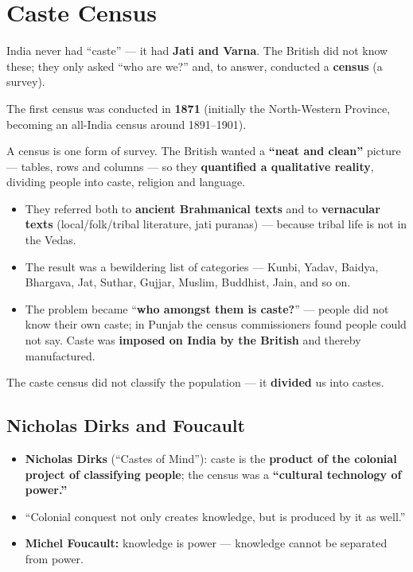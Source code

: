 \section{Caste Census}

India never had ``caste'' --- it had \textbf{Jati and Varna}. The British did not know these; they only asked ``who are we?'' and, to answer, conducted a \textbf{census} (a survey).

\begin{DataFact}
The first census was conducted in \textbf{1871} (initially the North-Western Province, becoming an all-India census around 1891--1901).
\end{DataFact}

A census is one form of survey. The British wanted a \textbf{``neat and clean''} picture --- tables, rows and columns --- so they \textbf{quantified a qualitative reality}, dividing people into caste, religion and language.

\begin{itemize}
\item They referred both to \textbf{ancient Brahmanical texts} and to \textbf{vernacular texts} (local/folk/tribal literature, jati puranas) --- because tribal life is not in the Vedas.
\item The result was a bewildering list of categories --- Kunbi, Yadav, Baidya, Bhargava, Jat, Suthar, Gujjar, Muslim, Buddhist, Jain, and so on.
\item The problem became ``\textbf{who amongst them is caste?}'' --- people did not know their own caste; in Punjab the census commissioners found people could not say. Caste was \textbf{imposed on India by the British} and thereby manufactured.
\end{itemize}

\begin{CriticalPoint}
The caste census did not classify the population --- it \textbf{divided} us into castes.
\end{CriticalPoint}

\subsection{Nicholas Dirks and Foucault}

\begin{KeyConcept}
\begin{itemize}
\item \textbf{Nicholas Dirks} (``Castes of Mind''): caste is the \textbf{product of the colonial project of classifying people}; the census was a \textbf{``cultural technology of power.''}
\item ``Colonial conquest not only creates knowledge, but is produced by it as well.''
\item \textbf{Michel Foucault:} knowledge is power --- knowledge cannot be separated from power.
\end{itemize}
\end{KeyConcept}

